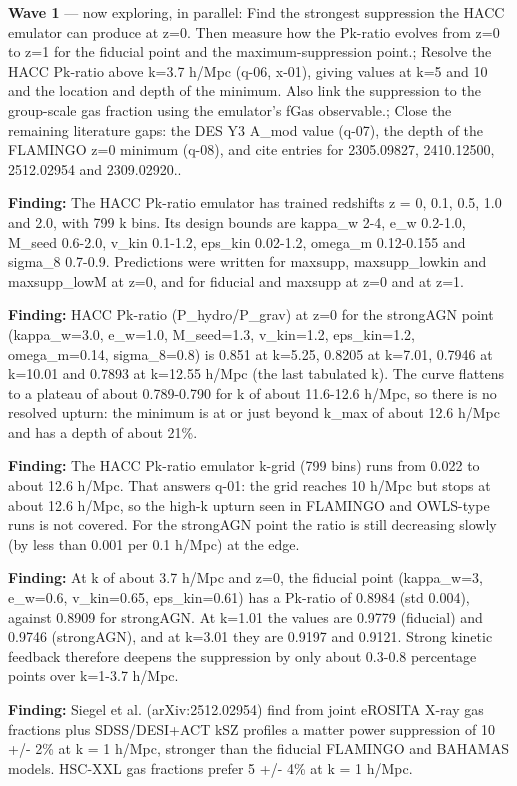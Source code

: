 \documentclass[11pt,a4paper]{article}
\begin{document}
\textbf{Wave 1} --- now exploring, in parallel: Find the strongest suppression the HACC emulator can produce at z=0. Then measure how the Pk-ratio evolves from z=0 to z=1 for the fiducial point and the maximum-suppression point.; Resolve the HACC Pk-ratio above k=3.7 h/Mpc (q-06, x-01), giving values at k=5 and 10 and the location and depth of the minimum. Also link the suppression to the group-scale gas fraction using the emulator's fGas observable.; Close the remaining literature gaps: the DES Y3 A\_mod value (q-07), the depth of the FLAMINGO z=0 minimum (q-08), and cite entries for 2305.09827, 2410.12500, 2512.02954 and 2309.02920..

\textbf{Finding:} The HACC Pk-ratio emulator has trained redshifts z = 0, 0.1, 0.5, 1.0 and 2.0, with 799 k bins. Its design bounds are kappa\_w 2-4, e\_w 0.2-1.0, M\_seed 0.6-2.0, v\_kin 0.1-1.2, eps\_kin 0.02-1.2, omega\_m 0.12-0.155 and sigma\_8 0.7-0.9. Predictions were written for maxsupp, maxsupp\_lowkin and maxsupp\_lowM at z=0, and for fiducial and maxsupp at z=0 and at z=1.

\textbf{Finding:} HACC Pk-ratio (P\_hydro/P\_grav) at z=0 for the strongAGN point (kappa\_w=3.0, e\_w=1.0, M\_seed=1.3, v\_kin=1.2, eps\_kin=1.2, omega\_m=0.14, sigma\_8=0.8) is 0.851 at k=5.25, 0.8205 at k=7.01, 0.7946 at k=10.01 and 0.7893 at k=12.55 h/Mpc (the last tabulated k). The curve flattens to a plateau of about 0.789-0.790 for k of about 11.6-12.6 h/Mpc, so there is no resolved upturn: the minimum is at or just beyond k\_max of about 12.6 h/Mpc and has a depth of about 21\%.

\textbf{Finding:} The HACC Pk-ratio emulator k-grid (799 bins) runs from 0.022 to about 12.6 h/Mpc. That answers q-01: the grid reaches 10 h/Mpc but stops at about 12.6 h/Mpc, so the high-k upturn seen in FLAMINGO and OWLS-type runs is not covered. For the strongAGN point the ratio is still decreasing slowly (by less than 0.001 per 0.1 h/Mpc) at the edge.

\textbf{Finding:} At k of about 3.7 h/Mpc and z=0, the fiducial point (kappa\_w=3, e\_w=0.6, v\_kin=0.65, eps\_kin=0.61) has a Pk-ratio of 0.8984 (std 0.004), against 0.8909 for strongAGN. At k=1.01 the values are 0.9779 (fiducial) and 0.9746 (strongAGN), and at k=3.01 they are 0.9197 and 0.9121. Strong kinetic feedback therefore deepens the suppression by only about 0.3-0.8 percentage points over k=1-3.7 h/Mpc.

\textbf{Finding:} Siegel et al. (arXiv:2512.02954) find from joint eROSITA X-ray gas fractions plus SDSS/DESI+ACT kSZ profiles a matter power suppression of 10 +/- 2\% at k = 1 h/Mpc, stronger than the fiducial FLAMINGO and BAHAMAS models. HSC-XXL gas fractions prefer 5 +/- 4\% at k = 1 h/Mpc.
\end{document}
